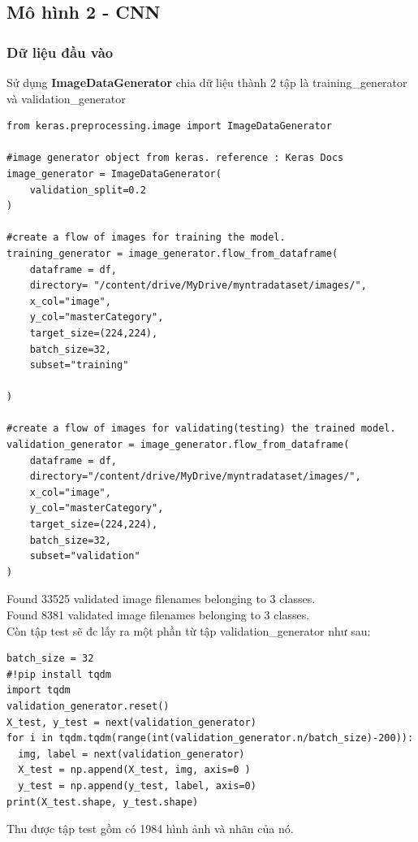 \newpage

\subsection{Mô hình 2 - CNN}
\subsubsection{Dữ liệu đầu vào }
Sử dụng \textbf{ImageDataGenerator} chia dữ liệu thành 2 tập là training\_generator và validation\_generator
\begin{lstlisting}
from keras.preprocessing.image import ImageDataGenerator

#image generator object from keras. reference : Keras Docs
image_generator = ImageDataGenerator(
    validation_split=0.2
)

#create a flow of images for training the model.
training_generator = image_generator.flow_from_dataframe(
    dataframe = df,
    directory= "/content/drive/MyDrive/myntradataset/images/",
    x_col="image",
    y_col="masterCategory",
    target_size=(224,224),
    batch_size=32,
    subset="training"

)

#create a flow of images for validating(testing) the trained model.
validation_generator = image_generator.flow_from_dataframe(
    dataframe = df,
    directory="/content/drive/MyDrive/myntradataset/images/",
    x_col="image",
    y_col="masterCategory",
    target_size=(224,224),
    batch_size=32,
    subset="validation"
)
\end{lstlisting}
Found 33525 validated image filenames belonging to 3 classes.\\
Found 8381 validated image filenames belonging to 3 classes.\\

Còn tập test sẽ đc lấy ra một phần từ tập validation\_generator như sau:
\begin{lstlisting}
batch_size = 32
#!pip install tqdm
import tqdm
validation_generator.reset()
X_test, y_test = next(validation_generator)
for i in tqdm.tqdm(range(int(validation_generator.n/batch_size)-200)): 
  img, label = next(validation_generator)
  X_test = np.append(X_test, img, axis=0 )
  y_test = np.append(y_test, label, axis=0)
print(X_test.shape, y_test.shape)
\end{lstlisting}
Thu được tập test gồm có 1984 hình ảnh và nhãn của nó.

